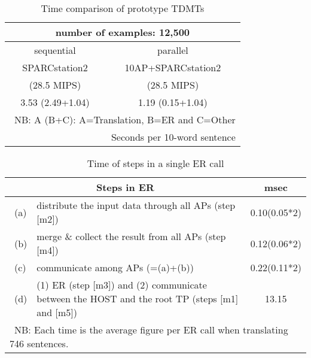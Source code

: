 \begin{table}[t]
  \begin{center}
    \caption{Time comparison of prototype TDMTs}
    \label{tbl-condition-proto}
    \begin{tabular}{|@{\hspace*{1em}}c@{\hspace*{1em}}|c|} \hline
         \multicolumn{2}{|c|}{number of examples: 12,500} \\ \hline
         sequential & parallel \\ \hline
         SPARCstation2 & 10AP+SPARCstation2 \\[-1ex]
          (28.5  MIPS) & \hspace*{3em}(28.5  MIPS) \\ \hline
         3.53 (2.49+1.04) & 1.19 (0.15+1.04) \\ \hline
    \multicolumn{2}{r}{\ NB: A (B+C): A=Translation, B=ER and C=Other}\\[-1ex]
    \multicolumn{2}{r}{Seconds per 10-word sentence}
    \end{tabular}
  \end{center}
\end{table}

{
\begin{table}[t]
  \begin{center}
    \caption{Time of steps in a single ER call}
    \label{tbl-ap-data}
    \tabcolsep=1mm
    \begin{tabular}{|lp{105mm}|c|} \hline
      \multicolumn{2}{|c|}{Steps in ER} & msec \\ \hline
      ~(a) & distribute the input data through all APs (step [m2])& \hspace{0.5em}0.10(0.05*2) \\
      ~(b) & merge \& collect the result from all APs (step [m4]) & \hspace{0.5em}0.12(0.06*2) \\
      ~(c) & communicate among APs  (=(a)+(b))& \hspace{0.5em}0.22(0.11*2) \\
      ~(d) &  (1) ER (step [m3]) and (2) communicate between the HOST and the root TP (steps [m1] and [m5])  & 13.15\\ \hline
       \multicolumn{3}{l}{
        \ NB: Each time is the average figure per ER call
        when translating 746 sentences.} 
    \end{tabular}
  \end{center}
\end{table}
}

